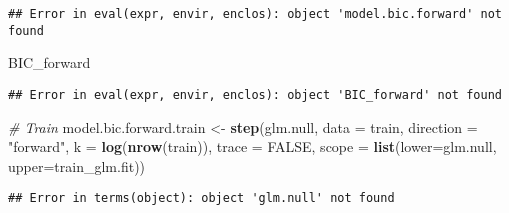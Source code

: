 \documentclass[]{article}
\newenvironment{Shaded}{\begin{snugshade}}{\end{snugshade}}
\newcommand{\CommentTok}[1]{\textcolor[rgb]{0.56,0.35,0.01}{\textit{#1}}}
\newcommand{\DataTypeTok}[1]{\textcolor[rgb]{0.13,0.29,0.53}{#1}}
\newcommand{\DecValTok}[1]{\textcolor[rgb]{0.00,0.00,0.81}{#1}}
\newcommand{\KeywordTok}[1]{\textcolor[rgb]{0.13,0.29,0.53}{\textbf{#1}}}
\newcommand{\NormalTok}[1]{#1}
\newcommand{\OperatorTok}[1]{\textcolor[rgb]{0.81,0.36,0.00}{\textbf{#1}}}
\newcommand{\OtherTok}[1]{\textcolor[rgb]{0.56,0.35,0.01}{#1}}
\newcommand{\StringTok}[1]{\textcolor[rgb]{0.31,0.60,0.02}{#1}}
\begin{document}
\begin{Shaded}
\end{Shaded}

\begin{verbatim}
## Error in eval(expr, envir, enclos): object 'model.bic.forward' not found
\end{verbatim}

\begin{Shaded}
\begin{Highlighting}[]
\NormalTok{BIC_forward}
\end{Highlighting}
\end{Shaded}

\begin{verbatim}
## Error in eval(expr, envir, enclos): object 'BIC_forward' not found
\end{verbatim}

\begin{Shaded}
\begin{Highlighting}[]
\CommentTok{# Train}
\NormalTok{model.bic.forward.train <-}\StringTok{ }\KeywordTok{step}\NormalTok{(glm.null, }\DataTypeTok{data =}\NormalTok{ train, }\DataTypeTok{direction =} \StringTok{"forward"}\NormalTok{, }\DataTypeTok{k =} \KeywordTok{log}\NormalTok{(}\KeywordTok{nrow}\NormalTok{(train)), }\DataTypeTok{trace =} \OtherTok{FALSE}\NormalTok{,}
                          \DataTypeTok{scope =} \KeywordTok{list}\NormalTok{(}\DataTypeTok{lower=}\NormalTok{glm.null, }\DataTypeTok{upper=}\NormalTok{train_glm.fit))}
\end{Highlighting}
\end{Shaded}

\begin{verbatim}
## Error in terms(object): object 'glm.null' not found
\end{verbatim}

\begin{Shaded}
\end{Shaded}
\end{document}
